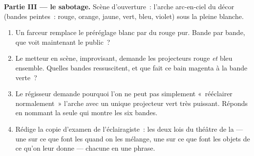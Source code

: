 \begin{problem}
\medskip\noindent\textbf{Partie III --- le sabotage.}
Scène d'ouverture~: l'arche arc-en-ciel du décor (bandes peintes~:
rouge, orange, jaune, vert, bleu, violet) sous la pleine 
blanche.
\begin{enumerate}[resume]
  \item Un farceur remplace le préréglage blanc par du rouge pur.
        Bande par bande, que voit maintenant le public~?
  \item Le metteur en scène, improvisant, demande les projecteurs
        rouge \emph{et} bleu ensemble. Quelles bandes
        ressuscitent, et que fait ce bain magenta à la bande
        verte~?
  \item Le régisseur demande pourquoi l'on ne peut pas simplement
        «~rééclairer normalement~» l'arche avec un unique
        projecteur vert très puissant. Réponds en nommant la seule
         qui montre les six bandes.
  \item Rédige la copie d'examen de l'éclairagiste~: les deux lois
        du théâtre de la  --- une sur ce que font les
         quand on les mélange, une sur ce que font les
        objets de ce qu'on leur donne --- chacune en une phrase.
\end{enumerate}
\end{problem}
